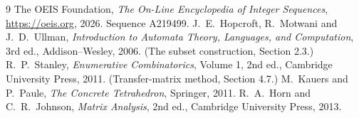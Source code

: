 \documentclass[11pt,a4paper]{article}
\theoremstyle{plain}
\theoremstyle{definition}
\begin{document}
\begin{thebibliography}{9}
 The OEIS Foundation, \emph{The On-Line Encyclopedia of Integer
Sequences}, \url{https://oeis.org}, 2026. Sequence A219499.
 J.~E.~Hopcroft, R.~Motwani and J.~D.~Ullman, \emph{Introduction to Automata
Theory, Languages, and Computation}, 3rd ed., Addison--Wesley, 2006. (The subset
construction, Section 2.3.)
 R.~P.~Stanley, \emph{Enumerative Combinatorics}, Volume 1, 2nd ed.,
Cambridge University Press, 2011. (Transfer-matrix method, Section 4.7.)
 M.~Kauers and P.~Paule, \emph{The Concrete Tetrahedron}, Springer, 2011.
 R.~A.~Horn and C.~R.~Johnson, \emph{Matrix Analysis}, 2nd ed., Cambridge
University Press, 2013.
\end{thebibliography}
\end{document}
